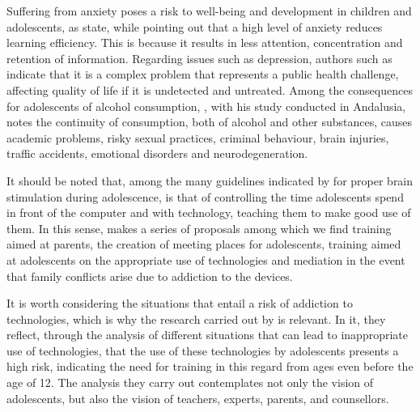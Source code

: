 \documentclass[english]{textolivre}
\begin{document}
Suffering from anxiety poses a risk to well-being and development in children and adolescents, as \textcite{lagosansiedad2014} %
state, while pointing out that a high level of anxiety reduces learning efficiency. This is because it results in less attention, concentration and retention of information. Regarding issues such as depression, authors such as \textcite{kassis2017understanding} %
indicate that it is a complex problem that represents a public health challenge, affecting quality of life if it is undetected and untreated. Among the consequences for adolescents of alcohol consumption, \textcite{rubiogonzalez2016consumo}, %
with his study conducted in Andalusia, notes the continuity of consumption, both of alcohol and other substances, causes academic problems, risky sexual practices, criminal behaviour, brain injuries, traffic accidents, emotional disorders and neurodegeneration.

It should be noted that, among the many guidelines indicated by \textcite{russi2021} %
for proper brain stimulation during adolescence, is that of controlling the time adolescents spend in front of the computer and with technology, teaching them to make good use of them. In this sense, \textcite{rocabelijar2019adiccion} %
makes a series of proposals among which we find training aimed at parents, the creation of meeting places for adolescents, training aimed at adolescents on the appropriate use of technologies and mediation in the event that family conflicts arise due to addiction to the devices.

It is worth considering the situations that entail a risk of addiction to technologies, which is why the research carried out by \textcite{diaz2019uso} %
is relevant. In it, they reflect, through the analysis of different situations that can lead to inappropriate use of technologies, that the use of these technologies by adolescents presents a high risk, indicating the need for training in this regard from ages even before the age of 12. The analysis they carry out contemplates not only the vision of adolescents, but also the vision of teachers, experts, parents, and counsellors.
\end{document}
